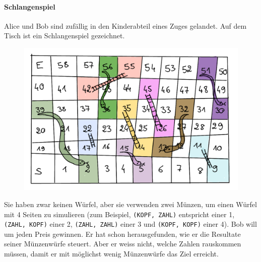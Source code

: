 \paragraph{Schlangenspiel}
Alice und Bob sind zufällig in den Kinderabteil eines Zuges gelandet. Auf dem Tisch ist ein Schlangenspiel gezeichnet.
\begin{figure}[H]
    \centering
    \includegraphics[width=\textwidth]{Pictures/SP/snakes_ladders_big.png}
\end{figure}
Sie haben zwar keinen Würfel, aber sie verwenden zwei Münzen, um einen Würfel mit 4 Seiten zu simulieren (zum Beispiel, \texttt{(KOPF, ZAHL)} entspricht einer 1, \texttt{(ZAHL, KOPF)} einer 2, \texttt{(ZAHL, ZAHL)} einer 3 und \texttt{(KOPF, KOPF)} einer 4).
Bob will um jeden Preis gewinnen. Er hat schon herausgefunden, wie er die Resultate seiner Münzenwürfe steuert. Aber er weiss nicht, welche Zahlen rauskommen müssen, damit er mit möglichst wenig Münzenwürfe das Ziel erreicht.

